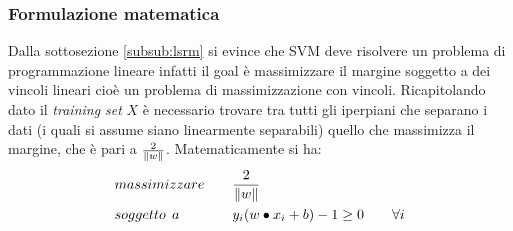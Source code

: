 \subsubsection{Formulazione matematica}
Dalla sottosezione \ref{subsub:lsrm} si evince che \ac{SVM} deve risolvere un problema di programmazione lineare infatti il goal è massimizzare il margine  soggetto a dei vincoli lineari cioè un problema di massimizzazione con vincoli. Ricapitolando dato il \textit{training set} $X$ è necessario trovare tra tutti gli iperpiani che separano i dati (i quali si assume siano linearmente separabili) quello che massimizza il margine, che è pari a $\frac{2}{\lVert w\rVert}$.  Matematicamente si ha:
\begin{alignat*}{2}
&massimizzare \quad&&\frac{2}{\lVert w\rVert} \\
&soggetto \:\:a &&y_i(w \bullet x_i +b) - 1 \geq 0 \qquad \forall i
\end{alignat*} 

